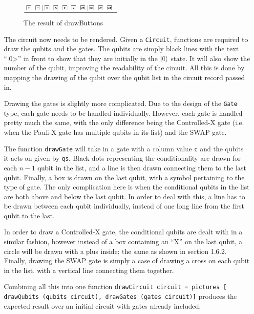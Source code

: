 \documentclass[a4paper,10pt, titlepage, twoside]{article}
\begin{document}
\begin{figure}
    \centering
    \includegraphics[width=0.45\textwidth]{buttons1}
    \caption{The result of drawButtons}
\end{figure}
The circuit now needs to be rendered. Given a \texttt{Circuit}, functions are required to draw the qubits and the gates. The qubits are simply black lines with the text ``|0>'' in front to show that they are initially in the $\ket 0$ state. It will also show the number of the qubit, improving the readability of the circuit. All this is done by mapping the drawing of the qubit over the qubit list in the circuit record passed in.\par
Drawing the gates is slightly more complicated. Due to the design of the \texttt{Gate} type, each gate needs to be handled individually. However, each gate is handled pretty much the same, with the only difference being the Controlled-X gate (i.e. when the Pauli-X gate has multiple qubits in its list) and the SWAP gate.\par
The function \texttt{drawGate} will take in a gate with a column value \texttt{c} and the qubits it acts on given by \texttt{qs}. Black dots representing the conditionality are drawn for each $n-1$ qubit in the list, and a line is then drawn connecting them to the last qubit. Finally, a box is drawn on the last qubit, with a symbol pertaining to the type of gate. The only complication here is when the conditional qubits in the list are both above and below the last qubit. In order to deal with this, a line has to be drawn between each qubit individually, instead of one long line from the first qubit to the last.\par
In order to draw a Controlled-X gate, the conditional qubits are dealt with in a similar fashion, however instead of a box containing an ``X'' on the last qubit, a circle will be drawn with a plus inside; the same as shown in section 1.6.2. Finally, drawing the SWAP gate is simply a case of drawing a cross on each qubit in the list, with a vertical line connecting them together.\par
Combining all this into one function \texttt{drawCircuit circuit = pictures [ drawQubits (qubits circuit), drawGates (gates circuit)]} produces the expected result over an initial circuit with gates already included.
\end{document}
